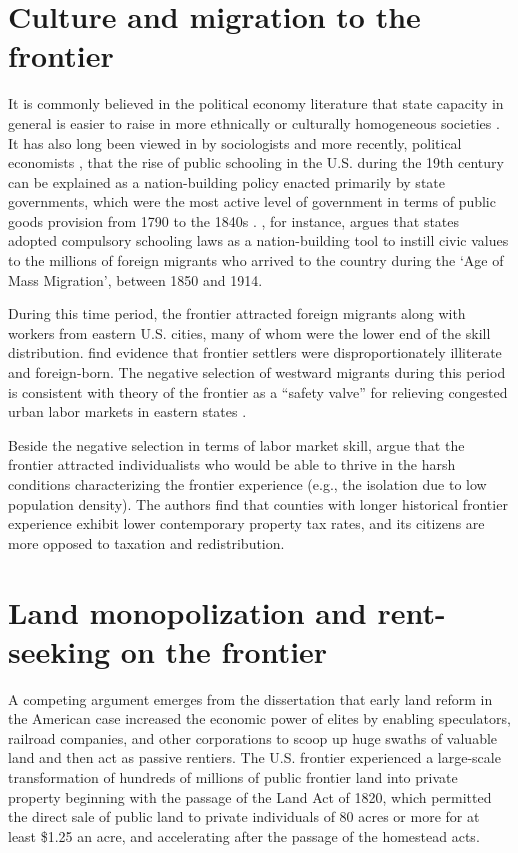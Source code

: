 \section{Culture and migration to the frontier}

It is commonly believed in the political economy literature that state capacity in general is easier to raise in more ethnically or culturally homogeneous societies \citep{besley2010state}. It has also long been viewed in by sociologists \citep{meyer1979public} and more recently, political economists \citep{alesina2013nation,bandiera2018nation}, that the rise of public schooling in the U.S. during the 19th century can be explained as a nation-building policy enacted primarily by state governments, which were the most active level of government in terms of public goods provision from 1790 to the 1840s \citep{wallis2000american}. \citet{bandiera2018nation}, for instance, argues that states adopted compulsory schooling laws as a nation-building tool to instill civic values to the millions of foreign migrants who arrived to the country during the `Age of Mass Migration', between 1850 and 1914. 

During this time period, the frontier attracted foreign migrants along with workers from eastern U.S. cities, many of whom were the lower end of the skill distribution. \citet{bazzi2017frontier} find evidence that frontier settlers were disproportionately illiterate and foreign-born. The negative selection of westward migrants during this period is consistent with theory of the frontier as a ``safety valve'' for relieving congested urban labor markets in eastern states \citep{turner1956significance, ferrie1997migration}.

Beside the negative selection in terms of labor market skill, \citet{bazzi2017frontier} argue that the frontier attracted individualists who would be able to thrive in the harsh conditions characterizing the frontier experience (e.g., the isolation due to low population density). The authors find that counties with longer historical frontier experience exhibit lower contemporary property tax rates, and its citizens are more opposed to taxation and redistribution. 

\section{Land monopolization and rent-seeking on the frontier} 

A competing argument emerges from the dissertation that early land reform in the American case increased the economic power of elites by enabling speculators, railroad companies, and other corporations to scoop up huge swaths of valuable land and then act as passive rentiers.  The U.S. frontier experienced a large-scale transformation of hundreds of millions of public frontier land into private property beginning with the passage of the Land Act of 1820, which permitted the direct sale of public land to private individuals of 80 acres or more for at least \$1.25 an acre, and accelerating after the passage of the homestead acts. 

